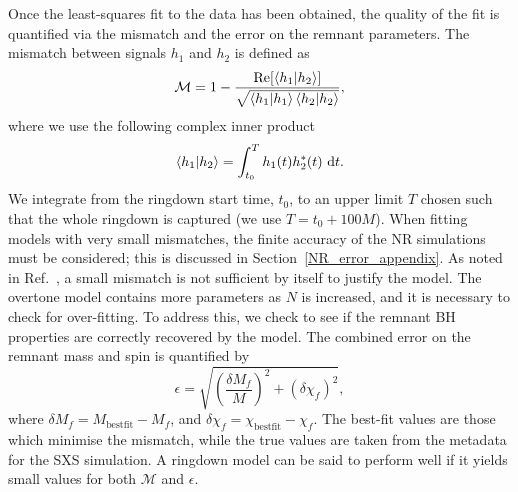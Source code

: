 Once the least-squares fit to the data has been obtained, the quality of the fit is quantified via the mismatch and the error on the remnant parameters.
The mismatch between signals $h_1$ and $h_2$ is defined as
\begin{equation}\label{mismatch}
    \mathcal{M} = 1 - \frac{\Re[\braket{h_1}{h_2}]}{\sqrt{\braket{h_1}\braket{h_2}}},
\end{equation}
where we use the following complex inner product~\cite{Nollert:1998ys}
\begin{equation} \label{eq:inner_prod}
    \braket{h_1}{h_2} = \int_{t_0}^T h_1(t) h^*_2(t) ~ \dd t.
\end{equation}
We integrate from the ringdown start time, $t_0$, to an upper limit $T$ chosen such that the whole ringdown is captured (we use $T = t_0 + 100M$).
When fitting models with very small mismatches, the finite accuracy of the NR simulations must be considered; this is discussed in Section~\ref{NR_error_appendix}.
As noted in Ref.~\cite{Giesler:2019uxc}, a small mismatch is not sufficient by itself to justify the model.
The overtone model contains more parameters as $N$ is increased, and it is necessary to check for over-fitting.
To address this, we check to see if the remnant BH properties are correctly recovered by the model. 
The combined error on the remnant mass and spin is quantified by~\cite{Giesler:2019uxc}
\begin{equation} \label{eq:epsilon}
    \epsilon = \sqrt{ \left( \frac{\delta M_f}{M} \right)^2 + \left( \delta\chi_f \right)^2 },
\end{equation}
where $\delta M_f = M_{\mathrm{best fit}} - M_f$, and $\delta \chi_f = \chi_{\mathrm{best fit}} - \chi_f$. 
The best-fit values are those which minimise the mismatch, while the true values are taken from the metadata for the SXS simulation.
A ringdown model can be said to perform well if it yields small values for both $\mathcal{M}$ and $\epsilon$.

